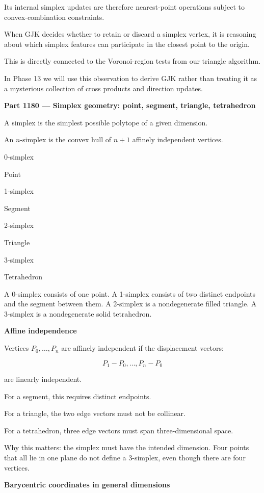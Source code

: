 Its internal simplex updates are therefore nearest-point operations subject to convex-combination constraints.

When GJK decides whether to retain or discard a simplex vertex, it is reasoning about which simplex features can participate in the closest point to the origin.

This is directly connected to the Voronoi-region tests from our triangle algorithm.

In Phase 13 we will use this observation to derive GJK rather than treating it as a mysterious collection of cross products and direction updates.

\textbf{Part 1180 --- Simplex geometry: point, segment, triangle, tetrahedron}

A simplex is the simplest possible polytope of a given dimension.

An \(n\)-simplex is the convex hull of \(n+1\) affinely independent vertices.

0-simplex

Point

1-simplex

Segment

2-simplex

Triangle

3-simplex

Tetrahedron

A 0-simplex consists of one point. A 1-simplex consists of two distinct endpoints and the segment between them. A 2-simplex is a nondegenerate filled triangle. A 3-simplex is a nondegenerate solid tetrahedron.

\textbf{Affine independence}

Vertices \(P_0,\ldots,P_n\) are affinely independent if the displacement vectors:

\[
P_1-P_0,\ldots,P_n-P_0
\]

are linearly independent.

For a segment, this requires distinct endpoints.

For a triangle, the two edge vectors must not be collinear.

For a tetrahedron, three edge vectors must span three-dimensional space.

Why this matters: the simplex must have the intended dimension. Four points that all lie in one plane do not define a 3-simplex, even though there are four vertices.

\textbf{Barycentric coordinates in general dimensions}


